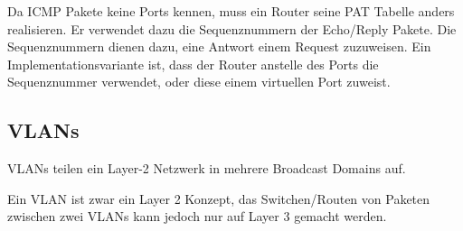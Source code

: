 Da ICMP Pakete keine Ports kennen, muss ein Router seine PAT Tabelle anders
realisieren. Er verwendet dazu die Sequenznummern der Echo/Reply Pakete. Die Sequenznummern
dienen dazu, eine Antwort einem Request zuzuweisen. Ein Implementationsvariante
ist, dass der Router anstelle des Ports die Sequenznummer verwendet, oder diese
einem virtuellen Port zuweist.


\subsection{VLANs}

VLANs teilen ein Layer-2 Netzwerk in mehrere Broadcast Domains auf.

Ein VLAN ist zwar ein Layer 2 Konzept, das Switchen/Routen von Paketen zwischen
zwei VLANs kann jedoch nur auf Layer 3 gemacht werden.
